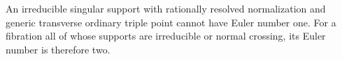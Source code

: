 
\begin{proposition}[P4.34]\hypertarget{tag-02X7}{}\label{night:P4.34}\label{stmt:P4.34}


An irreducible singular support with rationally resolved
normalization and generic transverse ordinary triple point
cannot have Euler number one. For a fibration all of whose
supports are irreducible or normal crossing, its Euler number
is therefore two.
\end{proposition}

